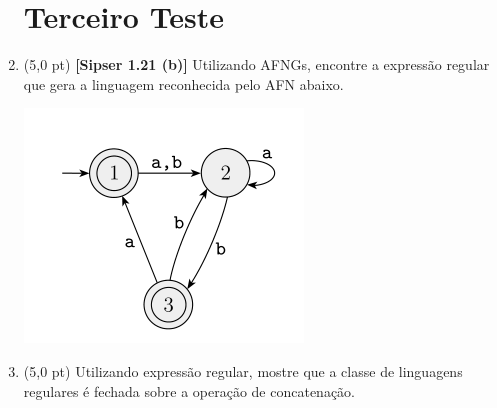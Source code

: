 \documentclass[12pt,a4paper,oneside]{article}
\begin{document}
\begin{enumerate}
	
	\section*{Terceiro Teste}
	
	\item (5,0 pt) {\bf [Sipser 1.21 (b)]} Utilizando AFNGs, encontre a expressão regular que gera a linguagem reconhecida pelo AFN abaixo.
		\begin{center}
			\includegraphics[width=.5\textwidth]{images/afn}
		\end{center}
	
	\item (5,0 pt) Utilizando expressão regular, mostre que a classe de linguagens regulares é fechada sobre a operação de concatenação.

\end{enumerate}
\end{document}

